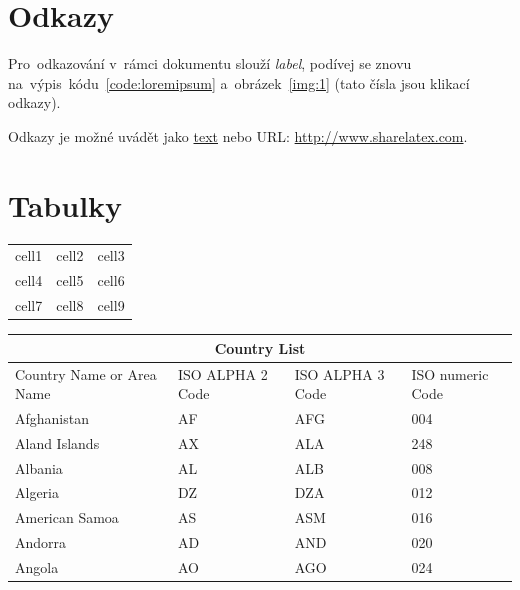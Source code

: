 \section{Odkazy}

\noindent Pro~odkazování v~rámci dokumentu slouží \emph{label}, podívej se znovu na~výpis~kódu~\ref{code:loremipsum} a~obrázek~\ref{img:1} (tato čísla jsou klikací odkazy).

\noindent Odkazy je možné uvádět jako \href{http://www.sharelatex.com}{text} nebo URL: \url{http://www.sharelatex.com}.

\section{Tabulky}

\begin{center}
\begin{tabular}{ c c c }
 cell1 & cell2 & cell3 \\ 
 cell4 & cell5 & cell6 \\  
 cell7 & cell8 & cell9    
\end{tabular}
\end{center}

\begin{center}
\begin{tabular}{ |p{3cm}||p{3cm}|p{3cm}|p{3cm}|  }
 \hline
 \multicolumn{4}{|c|}{Country List} \\
 \hline
 Country Name     or Area Name& ISO ALPHA 2 Code &ISO ALPHA 3 Code&ISO numeric Code\\
 \hline
 Afghanistan   & AF    &AFG&   004\\
 Aland Islands&   AX  & ALA   &248\\
 Albania &AL & ALB&  008\\
 Algeria    &DZ & DZA&  012\\
 American Samoa&   AS  & ASM&016\\
 Andorra& AD  & AND   &020\\
 Angola& AO  & AGO&024\\
 \hline
\end{tabular}
\end{center}